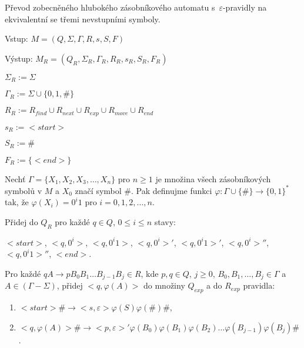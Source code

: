 \begin{Alg}\label{alg_gen_deep_pda_nonterm}
Převod zobecněného hlubokého zásobníkového automatu s~$\varepsilon$-pravidly na ekvivalentní se třemi nevstupními symboly.

\begin{list}{}{\setlength\parsep{0cm} \setlength\itemsep{0cm} \setlength\leftmargin{1em}}
   \item Vstup: $M = (Q,\Sigma,\Gamma, R, s, S, F)$ 
   \item Výstup: $M_{R} = (Q_{R}, \Sigma_{R}, {\Gamma}_{R}, R_{R}, s_{R},  S_{R}, F_{R})$ \medskip
  
   \item ${\Sigma}_{R} := \Sigma$
   \item ${\Gamma}_{R} := \Sigma \cup \{0,1,\#\}$
   \item $R_{R} := R_{find} \cup R_{next} \cup R_{exp} \cup R_{move} \cup R_{end}$
   \item $s_{R} := <start> $
   \item $S_{R} := \# $
   \item $F_{R} := \{<end>\} $ \medskip

\medskip

  \item Nechť $\Gamma = \{X_1, X_2, X_3, \dots, X_n\}$ pro $n \ge 1$ je množina všech zásobníkových symbolů v $M$ a $X_0$ značí symbol $\#$. Pak definujme funkci $\varphi : \Gamma \cup \{\#\} \rightarrow \{0,1\}^*$ tak, že $\varphi (X_i)=0^i 1$ pro $i = 0,1,2,\dots,n$. \medskip

  \item Přidej do $Q_R$ pro každé $q \in Q$, $0 \le i \le n$ stavy:
  \item $<start>$, $<q, 0^i>$, $<q, 0^i 1>$, $<q, 0^i>'$, $<q, 0^i 1>'$, $<q, 0^i>''$, $<q, 0^i 1>''$, $<end>$.\medskip

  \item Pro každé $qA \rightarrow p B_0 B_1 \dots B_{j-1} B_{j} \in R$, kde $p, q \in Q$, $j \ge 0$, $B_0,B_1,\dots,B_j \in \Gamma$ a $A \in (\Gamma - \Sigma)$, 
          přidej $<q, \varphi (A)>$ do množiny $Q_{exp}$  a do $R_{exp}$ pravidla:

\begin{enumerate}
\renewcommand{\labelenumi}{(\roman{enumi})}

  \item $<start> \# \rightarrow <s, \varepsilon> \varphi(S)\varphi(\#)\#$,
  \item $<q, \varphi (A)> \# \rightarrow <p, \varepsilon>' \varphi(B_0)\varphi(B_1)\varphi(B_2) \dots \varphi(B_{j-1}) \varphi(B_{j}) \#$.


\end{enumerate}
\end{list}
\end{Alg}
